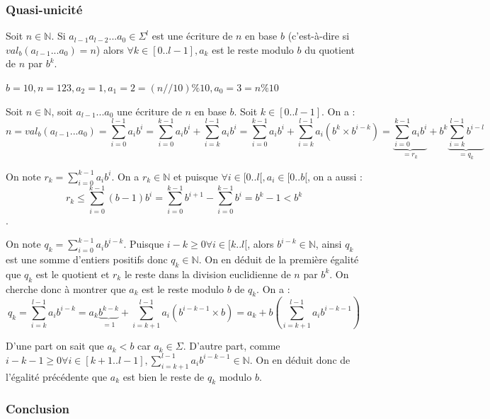 \documentclass{scrartcl}
\begin{document}
			\subsubsection{Quasi-unicité}
				
				\noindent \prop Soit $n \in \mathbb{N}$.
				Si $a_{l-1}a_{l-2}...a_0 \in \Sigma^l$ est une écriture de $n$ en base $b$ (c'est-à-dire si $val_b(a_{l-1}...a_0) = n$)
				alors $\forall k \in [0..l-1], a_k$ est le reste modulo $b$ du quotient de $n$ par $b^k$.

				\noindent \exemple $b=10, n=123, a_2=1, a_1=2=(n//10)\%10, a_0=3=n\%10$

				\begin{demo}
					\item
						Soit $n \in \mathbb{N}$, soit $a_{l-1}...a_0$ une écriture de $n$ en base $b$. Soit $k \in [0..l-1]$.
						On a : $$n = val_b(a_{l-1}...a_0) = \sum_{i=0}^{l-1} a_ib^i = 
						\sum_{i=0}^{k-1} a_ib^i + \sum_{i=k}^{l-1} a_ib^i =
						\sum_{i=0}^{k-1} a_ib^i + \sum_{i=k}^{l-1} a_i(b^k \times b^{i-k}) =
						\underbrace{\sum_{i=0}^{k-1} a_ib^i}_{=r_k} + b^k \underbrace{\sum_{i=k}^{l-1} b^{i-l}}_{=q_k}$$

						On note $r_k = \sum_{i=0}^{k-1} a_ib^i$. On a $r_k \in \mathbb{N}$ et puisque $\forall i \in [0..l[, a_i \in [0..b[$, on a aussi :
						$$r_k \leqslant \sum_{i=0}^{k-1} (b-1)b^i = \sum_{i=0}^{k-1} b^{i+1} - \sum_{i=0}^{k-1} b^i = b^k-1 < b^k$$.

						On note $q_k = \sum_{i=0}^{k-1} a_ib^{i-k}$. Puisque $i-k \geqslant 0 \forall i \in [k..l[$, alors $b^{i-k} \in \mathbb{N}$,
						ainsi $q_k$ est une somme d'entiers positifs donc $q_k \in \mathbb{N}$.
						On en déduit de la première égalité que $q_k$ est le quotient et $r_k$ le reste dans la division euclidienne de $n$ par $b^k$.
						On cherche donc à montrer que $a_k$ est le reste modulo $b$ de $q_k$. On a :
						$$q_k = \sum_{i=k}^{l-1} a_ib^{i-k} = a_k\underbrace{b^{k-k}}_{=1} + \sum_{i=k+1}^{l-1} a_i(b^{i-k-1} \times b)
						= a_k + b \left( \sum_{i=k+1}^{l-1} a_ib^{i-k-1} \right)$$

						D'une part on sait que $a_k < b$ car $a_k \in \Sigma$. D'autre part, comme $i-k-1 \geqslant 0 \forall i \in [k+1..l-1],
						\sum_{i=k+1}^{l-1} a_ib^{i-k-1} \in \mathbb{N}$. On en déduit donc de l'égalité précédente que $a_k$ est bien le reste de $q_k$ modulo $b$.
				\end{demo}

			\subsubsection{Conclusion}
\end{document}
